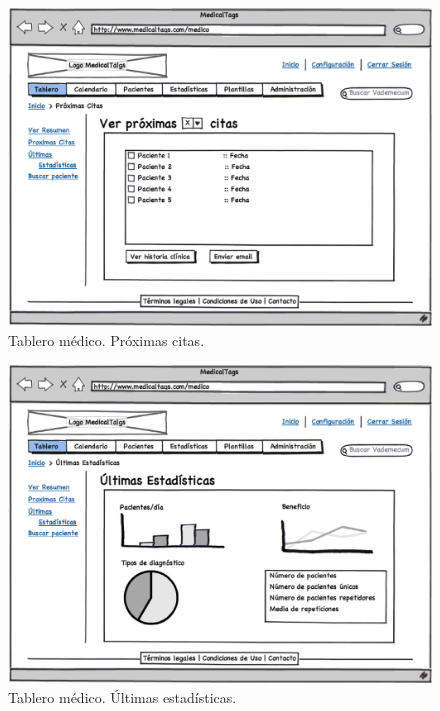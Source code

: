 			
			\begin{figure}[H]
			  \centering
			    \includegraphics[width=12cm]{img/eps/9_Dashboard_Medico_Tablero_Citas.eps}
			  \caption{Tablero médico. Próximas citas.}
			  \label{fig:tablero_medico_citas}
			\end{figure}
			
			\begin{figure}[H]
			  \centering
			    \includegraphics[width=12cm]{img/eps/10_Dashboard_Medico_Tablero_Estadisticas.eps}
			  \caption{Tablero médico. Últimas estadísticas.}
			  \label{fig:tablero_medico_estadisticas}
			\end{figure}
			
